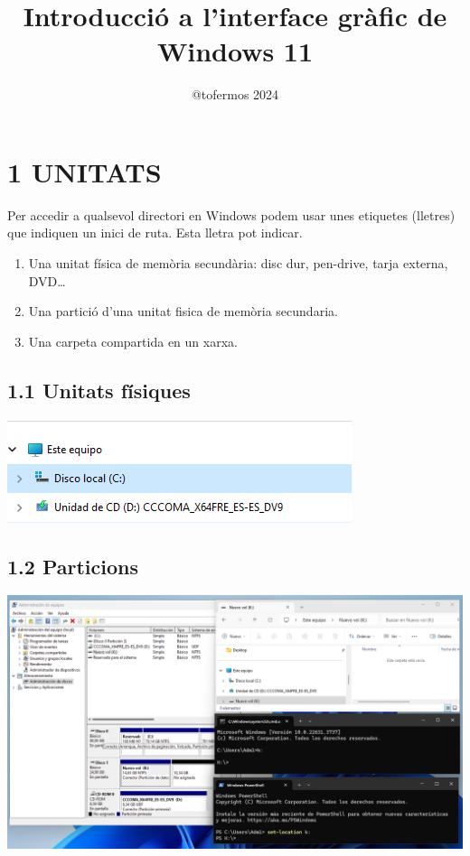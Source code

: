 \documentclass[
  a4paper,
]{article}
\title{Introducció a l'interface gràfic de Windows 11}
\author{@tofermos 2024}
\date{}
\providecommand{\tightlist}{%
  \setlength{\itemsep}{0pt}\setlength{\parskip}{0pt}}
\begin{document}
\maketitle

{
\setcounter{tocdepth}{2}
\tableofcontents
}
\newpage

\renewcommand\tablename{Tabla}

\section{1 UNITATS}\label{unitats}

Per accedir a qualsevol directori en Windows podem usar unes etiquetes
(lletres) que indiquen un inici de ruta. Esta lletra pot indicar.

\begin{enumerate}
\def\labelenumi{\arabic{enumi}.}
\tightlist
\item
  Una unitat física de memòria secundària: disc dur, pen-drive, tarja
  externa, DVD\ldots{}
\item
  Una partició d'una unitat fisica de memòria secundaria.
\item
  Una carpeta compartida en un xarxa.
\end{enumerate}

\subsection{1.1 Unitats físiques}\label{unitats-fuxedsiques}

\includegraphics{png/unitatsDiscos.png}

\subsection{1.2 Particions}\label{particions}

\includegraphics{png/unitatFormatejada.png}
\end{document}
